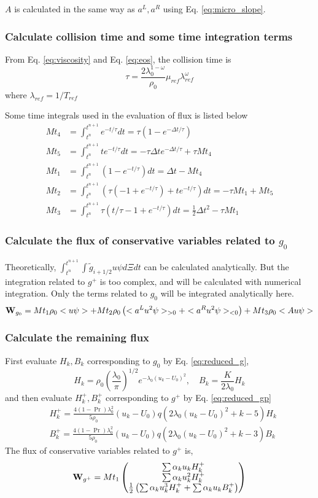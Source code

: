 \documentclass[a4paper]{book}
\begin{document}
$A$ is calculated in the same way as $a^L,a^R$ using Eq. \ref{eq:micro_slope}.

\subsubsection*{Calculate collision time and some time integration terms}
From Eq. \ref{eq:viscosity} and Eq. \ref{eq:eos}, the collision time is
$$\tau = \frac{2\lambda_0^{1-\omega}}{\rho_0}\mu_{ref}\lambda_{ref}^\omega$$
where $\lambda_{ref}=1/T_{ref}$

Some time integrals used in the evaluation of flux is listed below
$$
\begin{aligned}
    Mt_4 &= \int_{t^n}^{t^{n+1}} e^{-t/\tau}dt = \tau(1-e^{-\Delta t/\tau}) \\
    Mt_5 &= \int_{t^n}^{t^{n+1}} te^{-t/\tau}dt = -\tau\Delta t e^{-\Delta t/\tau}+\tau Mt_4 \\
    Mt_1 &= \int_{t^n}^{t^{n+1}} (1-e^{-t/\tau})dt = \Delta t-Mt_4 \\
    Mt_2 &= \int_{t^n}^{t^{n+1}} (\tau(-1+e^{-t/\tau})+te^{-t/\tau})dt = -\tau Mt_1+Mt_5 \\
    Mt_3 &= \int_{t^n}^{t^{n+1}} \tau(t/\tau-1+e^{-t/\tau})dt = \frac{1}{2}\Delta t^2-\tau Mt_1
\end{aligned} 
$$

\subsubsection*{Calculate the flux of conservative variables related to $g_0$}
Theoretically, $\int_{t^n}^{t^{n+1}}\int {\tilde g}_{i+1/2}u\psi d\Xi dt$ can be calculated analytically. But the integration related to $g^+$ is too complex, and will be calculated with numerical integration. Only the terms related to $g_0$ will be integrated analytically here.
$${\bf W}_{g_0} = Mt_1\rho_0<u\psi>+Mt_2\rho_0\left(<a^Lu^2\psi>_{>0}+<a^Ru^2\psi>_{<0}\right)+Mt_3\rho_0<Au\psi>$$

\subsubsection*{Calculate the remaining flux}
First evaluate $H_k,B_k$ corresponding to $g_0$ by Eq. \ref{eq:reduced_g},
$$H_k = \rho_0\left(\frac{\lambda_0}{\pi}\right)^{1/2}e^{-\lambda_0(u_k-U_0)^2},\quad B_k = \frac{K}{2\lambda_0}H_k$$
and then evaluate $H_{k}^+,B_{k}^+$ corresponding to $g^+$ by Eq. \ref{eq:reduced_gp}
$$
\begin{aligned}
    & H_k^+ = \frac{4(1-\Pr)\lambda_0^2}{5\rho_0}(u_k-U_0)q(2\lambda_0(u_k-U_0)^2+k-5)H_k\\
    & B_k^+ = \frac{4(1-\Pr)\lambda_0^2}{5\rho_0}(u_k-U_0)q(2\lambda_0(u_k-U_0)^2+k-3)B_k
\end{aligned}
$$
The flux of conservative variables related to $g^+$ is,
$$
{\bf W}_{g^+} = Mt_1
\begin{pmatrix}
    \sum\alpha_k u_k H_k^+\\ \sum\alpha_k u_k^2 H_k^+\\ \frac{1}{2}\left(\sum\alpha_k u_k^3 H_k^+ + \sum\alpha_k u_k B_k^+\right)
\end{pmatrix}
$$
\end{document}
